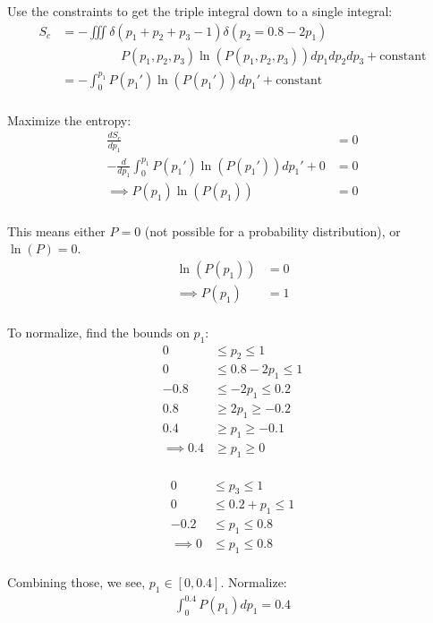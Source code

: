 \begin{enumerate}[label=\textbf{\Alph*}.]
    Use the constraints to get the triple integral down to a single integral:
    \begin{align*}
        S_c &= -\iiint \delta(p_1 + p_2 + p_3 - 1) \delta(p_2 = 0.8 - 2p_1) \\
        &\hspace{2cm}P(p_1, p_2, p_3) \ln(P(p_1, p_2, p_3)) dp_1 dp_2 dp_3 + \text{constant} \\
        &= -\int_0^{p_1} P(p_1') \ln(P(p_1')) dp_1' + \text{constant} \\
    \end{align*}

    Maximize the entropy:
    \begin{align*}
        \frac{dS_c}{dp_1} &= 0 \\
        -\frac{d}{dp_1}\int_0^{p_1} P(p_1') \ln(P(p_1')) dp_1' + 0 &= 0 \\
        \implies P(p_1) \ln(P(p_1)) &= 0 \\
    \end{align*}

    This means either $P = 0$ (not possible for a probability distribution), or $\ln(P) = 0$.
    \begin{align*}
        \ln(P(p_1)) &= 0 \\
        \implies P(p_1) &= 1 \\
    \end{align*}

    To normalize, find the bounds on $p_1$:
    \begin{align*}
        0 &\le p_2 \le 1 \\
        0 &\le 0.8 - 2p_1 \le 1 \\
        -0.8 &\le - 2p_1 \le 0.2 \\
        0.8 &\ge 2p_1 \ge -0.2 \\
        0.4 &\ge p_1 \ge -0.1 \\
        \implies 0.4 &\ge p_1 \ge 0 \\
    \end{align*}

    \begin{align*}
        0 &\le p_3 \le 1 \\
        0 &\le 0.2 + p_1 \le 1 \\
        -0.2 &\le p_1 \le 0.8 \\
        \implies 0 &\le p_1 \le 0.8 \\
    \end{align*}

    Combining those, we see, $p_1 \in [0, 0.4]$. Normalize:
    \begin{align*}
        \int_0^{0.4} P(p_1) dp_1 = 0.4
    \end{align*}


\end{enumerate}
